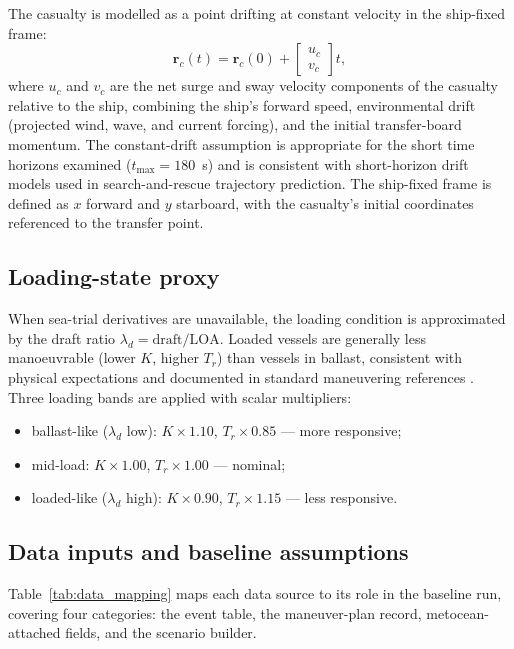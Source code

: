 \documentclass[preprint,12pt]{elsarticle}
\begin{document}
The casualty is modelled as a point drifting at constant velocity in the ship-fixed frame:
\begin{equation}
\mathbf{r}_c(t)=\mathbf{r}_c(0)+\begin{bmatrix}u_c\\v_c\end{bmatrix}t,
\end{equation}
where $u_c$ and $v_c$ are the net surge and sway velocity components of the casualty relative to the ship, combining the ship's forward speed, environmental drift (projected wind, wave, and current forcing), and the initial transfer-board momentum. The constant-drift assumption is appropriate for the short time horizons examined ($t_{\max}=180$~s) and is consistent with short-horizon drift models used in search-and-rescue trajectory prediction. The ship-fixed frame is defined as $x$ forward and $y$ starboard, with the casualty's initial coordinates referenced to the transfer point.

\subsection{Loading-state proxy}
When sea-trial derivatives are unavailable, the loading condition is approximated by the draft ratio $\lambda_d=\mathrm{draft}/\mathrm{LOA}$. Loaded vessels are generally less manoeuvrable (lower $K$, higher $T_r$) than vessels in ballast, consistent with physical expectations and documented in standard maneuvering references \cite{ref_fossen}. Three loading bands are applied with scalar multipliers:
\begin{itemize}
    \item ballast-like ($\lambda_d$ low): $K\times1.10$, $T_r\times0.85$ --- more responsive;
    \item mid-load: $K\times1.00$, $T_r\times1.00$ --- nominal;
    \item loaded-like ($\lambda_d$ high): $K\times0.90$, $T_r\times1.15$ --- less responsive.
\end{itemize}

\subsection{Data inputs and baseline assumptions}
Table~\ref{tab:data_mapping} maps each data source to its role in the baseline run, covering four categories: the event table, the maneuver-plan record, metocean-attached fields, and the scenario builder.
\end{document}
